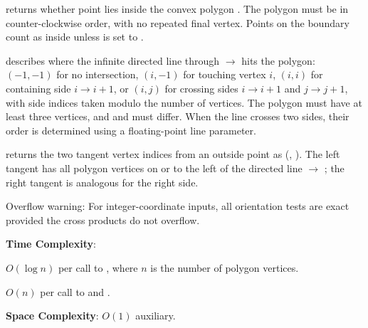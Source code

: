 \begin{compactitem}
  \item {} returns whether point  lies inside the convex polygon . The polygon must be in counter-clockwise order, with no repeated final vertex. Points on the boundary count as inside unless  is set to .
  \item {} describes where the infinite directed line through  $\to$  hits the polygon: $(-1, -1)$ for no intersection, $(i, -1)$ for touching vertex $i$, $(i, i)$ for containing side $i \to i+1$, or $(i, j)$ for crossing sides $i \to i+1$ and $j \to j+1$, with side indices taken modulo the number of vertices. The polygon must have at least three vertices, and  and  must differ. When the line crosses two sides, their order is determined using a floating-point line parameter.
  \item {} returns the two tangent vertex indices from an outside point  as (, ). The left tangent has all polygon vertices on or to the left of the directed line  $\to$ ; the right tangent is analogous for the right side.
\end{compactitem}

Overflow warning: For integer-coordinate inputs, all orientation tests are exact provided the cross products do not overflow.

\textbf{Time Complexity}:
\begin{compactitem}
  \item $O(\log n)$ per call to , where $n$ is the number of polygon vertices.
  \item $O(n)$ per call to  and .
\end{compactitem}

\textbf{Space Complexity}: $O(1)$ auxiliary.


